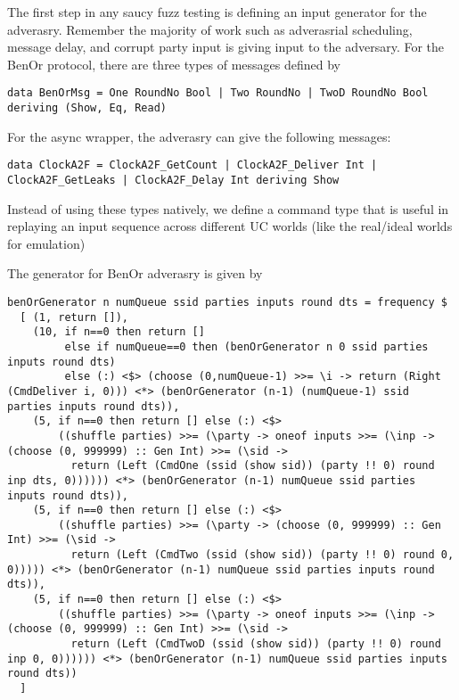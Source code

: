 The first step in any saucy fuzz testing is defining an input generator for the adverasry. 
Remember the majority of work such as adverasrial scheduling, message delay, and corrupt party input \Z is giving input to the adversary.   
For the BenOr protocol, there are three types of messages defined by
\begin{lstlisting}
data BenOrMsg = One RoundNo Bool | Two RoundNo | TwoD RoundNo Bool deriving (Show, Eq, Read)
\end{lstlisting}
For the async wrapper, the adverasry can give the following messages:
\begin{lstlisting}
data ClockA2F = ClockA2F_GetCount | ClockA2F_Deliver Int | ClockA2F_GetLeaks | ClockA2F_Delay Int deriving Show
\end{lstlisting}
Instead of using these types natively, we define a command type that is useful in replaying an input sequence across different UC worlds (like the real/ideal worlds for emulation)

The generator for BenOr adverasry is given by
\begin{lstlisting}
benOrGenerator n numQueue ssid parties inputs round dts = frequency $
  [ (1, return []), 
    (10, if n==0 then return []
         else if numQueue==0 then (benOrGenerator n 0 ssid parties inputs round dts)
         else (:) <$> (choose (0,numQueue-1) >>= \i -> return (Right (CmdDeliver i, 0))) <*> (benOrGenerator (n-1) (numQueue-1) ssid parties inputs round dts)),
    (5, if n==0 then return [] else (:) <$> 
        ((shuffle parties) >>= (\party -> oneof inputs >>= (\inp -> (choose (0, 999999) :: Gen Int) >>= (\sid -> 
          return (Left (CmdOne (ssid (show sid)) (party !! 0) round inp dts, 0)))))) <*> (benOrGenerator (n-1) numQueue ssid parties inputs round dts)),
    (5, if n==0 then return [] else (:) <$>
        ((shuffle parties) >>= (\party -> (choose (0, 999999) :: Gen Int) >>= (\sid -> 
          return (Left (CmdTwo (ssid (show sid)) (party !! 0) round 0, 0))))) <*> (benOrGenerator (n-1) numQueue ssid parties inputs round dts)),
    (5, if n==0 then return [] else (:) <$>
        ((shuffle parties) >>= (\party -> oneof inputs >>= (\inp -> (choose (0, 999999) :: Gen Int) >>= (\sid -> 
          return (Left (CmdTwoD (ssid (show sid)) (party !! 0) round inp 0, 0)))))) <*> (benOrGenerator (n-1) numQueue ssid parties inputs round dts)) 
  ]
\end{lstlisting}

